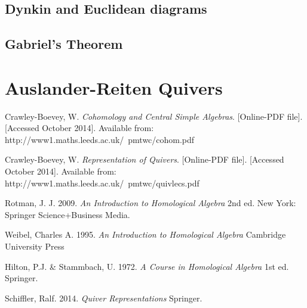 \documentclass[11.5pt, twoside, a4paper, titlepage]{report}
\theoremstyle{definition}
\theoremstyle{plain}
\begin{document}
\section{Dynkin and Euclidean diagrams}

\section{Gabriel's Theorem}

\chapter{Auslander-Reiten Quivers}














\begin{thebibliography}{99}

Crawley-Boevey, W.
\emph{Cohomology and Central Simple Algebras}. [Online-PDF file]. [Accessed October 2014].
Available from: http://www1.maths.leeds.ac.uk/~pmtwc/cohom.pdf

Crawley-Boevey, W.
\emph{Representation of Quivers}. [Online-PDF file]. [Accessed October 2014].
Available from: http://www1.maths.leeds.ac.uk/~pmtwc/quivlecs.pdf

Rotman, J. J.
2009.
\emph{An Introduction to Homological Algebra}
2nd ed.
New York: Springer Science+Business Media.

Weibel, Charles A.
1995.
\emph{An Introduction to Homological Algebra}
Cambridge University Press

Hilton, P.J. \& Stammbach, U.
1972.
\emph{A Course in Homological Algebra}
1st ed.
Springer.

Schiffler, Ralf.
2014.
\emph{Quiver Representations}
Springer.






\end{thebibliography}
\end{document}
